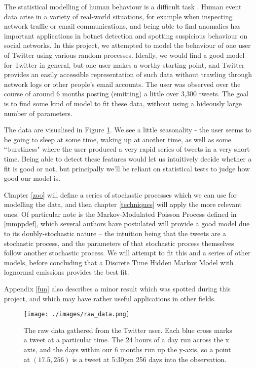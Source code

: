 The statistical modelling of human behaviour is a difficult task \cite{human_behaviour}. Human event data arise in a variety of real-world situations, for example when inspecting network traffic or email communications, and being able to find anomalies has important applications in botnet detection and spotting suspicious behaviour on social networks. In this project, we attempted to model the behaviour of one user of Twitter using various random processes. Ideally, we would find a good model for Twitter in general, but one user makes a worthy starting point, and Twitter provides an easily accessible representation of such data without trawling through network logs or other people's email accounts. The user was observed over the course of around 6 months posting (emitting) a little over 3,300 tweets. The goal is to find some kind of model to fit these data, without using a hideously large number of parameters.

The data are visualised in Figure \ref{raw_data}. We see a little seasonality - the user seems to be going to sleep at some time, waking up at another time, as well as some ``burstiness" where the user produced a very rapid series of tweets in a very short time. Being able to detect these features would let us intuitively decide whether a fit is good or not, but principally we'll be reliant on statistical tests to judge how good our model is.

Chapter \ref{zoo} will define a series of stochastic processes which we can use for modelling the data, and then chapter \ref{techniques} will apply the more relevant ones. Of particular note is the Markov-Modulated Poisson Process defined in \textsection\ref{mmppdef}, which several authors \cite{mmpp1}\cite{mmpp2}\cite{mmpp3} have postulated will provide a good model due to its doubly-stochastic nature -- the intuition being that the tweets are a stochastic process, and the parameters of that stochastic process themselves follow another stochastic process. We will attempt to fit this and a series of other models, before concluding that a Discrete Time Hidden Markov Model with lognormal emissions provides the best fit.

Appendix \ref{fun} also describes a minor result which was spotted during this project, and which may have rather useful applications in other fields.

\begin{figure}[h]
\centering
\texttt{[image: ./images/raw\_data.png]}
\caption{The raw data gathered from the Twitter user. Each blue cross marks a tweet at a particular time. The 24 hours of a day run across the x axis, and the days within our 6 months run up the y-axis, so a point at $(17.5, 256)$ is a tweet at 5:30pm 256 days into the observation.}
\label{raw_data}
\end{figure}